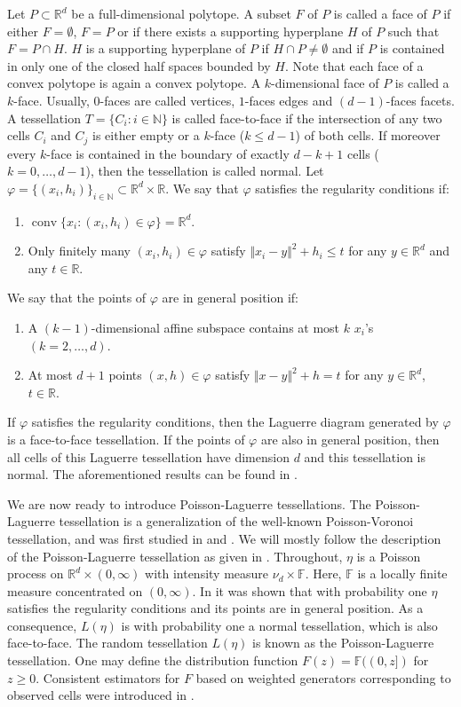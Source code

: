 \documentclass{article}
\newcommand{\NN}{\mathbb{N}}
\newcommand{\RR}{\mathbb{R}}
\DeclareMathOperator{\conv}{conv}
\theoremstyle{plain}
\theoremstyle{remark}
\theoremstyle{definition}
\begin{document}
Let $P \subset \RR^d$ be a full-dimensional polytope. A subset $F$ of $P$ is called a face of $P$ if either $F=\emptyset$, $F=P$ or if there exists a supporting hyperplane $H$ of $P$ such that $F=P\cap H$. $H$ is a supporting hyperplane of $P$ if $H \cap P \neq \emptyset$ and if $P$ is contained in only one of the closed half spaces bounded by $H$. Note that each face of a convex polytope is again a convex polytope. A $k$-dimensional face of $P$ is called a $k$-face. Usually, $0$-faces are called vertices, $1$-faces edges and $(d-1)$-faces facets. A tessellation $T = \{C_i: i\in \NN\}$ is called face-to-face if the intersection of any two cells $C_i$ and $C_j$ is either empty or a $k$-face ($k \leq d-1$) of both cells. If moreover every $k$-face is contained in the boundary of exactly $d-k+1$ cells ($k=0,\dots,d-1$), then the tessellation is called normal. Let $\varphi = \{(x_i,h_i)\}_{i \in \NN} \subset \RR^d \times \RR$. We say that $\varphi$ satisfies the regularity conditions if:
\begin{enumerate}
    \item $\conv\{x_i: (x_i,h_i) \in \varphi\} = \RR^d$.
    \item Only finitely many $(x_i,h_i) \in \varphi$ satisfy $\Vert x_i - y \Vert^2 + h_i \leq t$ for any $y \in \RR^d$ and any $t \in \RR$.
\end{enumerate}
We say that the points of $\varphi$ are in general position if:
\begin{enumerate}
    \item A $(k-1)$-dimensional affine subspace contains at most $k$ $x_i$'s $(k = 2,\dots,d)$.
    \item At most $d+1$ points $(x,h) \in \varphi$ satisfy $\Vert x - y \Vert^2 + h = t$ for any $y \in \RR^d$, $t \in \RR$. 
\end{enumerate}
If $\varphi$ satisfies the regularity conditions, then the Laguerre diagram generated by $\varphi$ is a face-to-face tessellation. If the points of $\varphi$ are also in general position, then all cells of this Laguerre tessellation have dimension $d$ and this tessellation is normal. The aforementioned results can be found in \cite{Lautensack2007}. 

We are now ready to introduce Poisson-Laguerre tessellations. The Poisson-Laguerre tessellation is a generalization of the well-known Poisson-Voronoi tessellation, and was first studied in \cite{Lautensack2007} and \cite{Lautensack2008}. We will mostly follow the description of the Poisson-Laguerre tessellation as given in \cite{gusakova2025}. Throughout, $\eta$ is a Poisson process on $\RR^d \times(0,\infty)$ with intensity measure $\nu_d \times \mathbb{F}$. Here, $\mathbb{F}$ is a locally finite measure concentrated on $(0,\infty)$. In \cite{gusakova2025} it was shown that with probability one $\eta$ satisfies the regularity conditions and its points are in general position. As a consequence, $L(\eta)$ is with probability one a normal tessellation, which is also face-to-face. The random tessellation $L(\eta)$ is known as the Poisson-Laguerre tessellation. One may define the distribution function $F(z) = \mathbb{F}((0,z])$ for $z \geq 0$. Consistent estimators for $F$ based on weighted generators corresponding to observed cells were introduced in \cite{vdjagt2025b}. 
\end{document}
